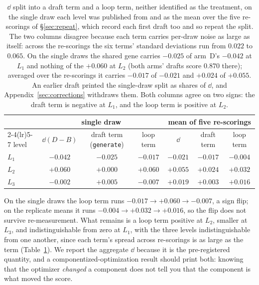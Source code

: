 \documentclass[11pt]{article}
\begin{document}
\begin{table}[h]
\centering
\small
\begin{tabular}{lcccccc}
\toprule
 & \multicolumn{3}{c}{single draw} & \multicolumn{3}{c}{mean of five re-scorings} \\
\cmidrule(lr){2-4}\cmidrule(lr){5-7}
level & $\dd(D-B)$ & draft term (\texttt{generate}) & loop term & $\dd$ & draft term & loop term \\
\midrule
$L_1$ & $-0.042$ & $\mathbf{-0.025}$ & $-0.017$ & $-0.021$ & $\mathbf{-0.017}$ & $-0.004$ \\
$L_2$ & $+0.060$ & $+0.000$ & $\mathbf{+0.060}$ & $+0.055$ & $+0.024$ & $\mathbf{+0.032}$ \\
$L_3$ & $-0.002$ & $+0.005$ & $-0.007$ & $+0.019$ & $+0.003$ & $+0.016$ \\
\bottomrule
\end{tabular}
\caption{$\dd$ split into a draft term and a loop term, neither identified as the treatment, on the
single draw each level was published from and as the mean over the five re-scorings of
\S\ref{sec:repeat}, which record each first draft too and so repeat the split. The two columns
disagree because each term carries per-draw noise as large as itself: across the re-scorings the
six terms' standard deviations run from $0.022$ to $0.065$. On the single draws the shared gene
carries $-0.025$ of arm~D's $-0.042$ at $L_1$ and nothing of the $+0.060$ at $L_2$
(both arms' drafts score $0.870$ there); averaged over the re-scorings it carries $-0.017$ of $-0.021$ and
$+0.024$ of $+0.055$. An earlier draft printed the single-draw split as shares of $\dd$, and
Appendix~\ref{sec:corrections} withdraws them. Both columns agree on two signs: the draft
term is negative at $L_1$, and the loop term is positive at $L_2$.}
\label{tab:decomp}
\end{table}

On the single draws the loop term runs $-0.017 \to +0.060 \to -0.007$, a sign flip; on the
replicate means it runs $-0.004 \to +0.032 \to +0.016$, so the flip does not survive
re-measurement. What remains is a loop term positive at $L_2$, smaller at $L_3$, and indistinguishable
from zero at $L_1$, with the three levels indistinguishable from one another, since each term's
spread across re-scorings is as large as the term (Table~\ref{tab:decomp}). We report the
aggregate $\dd$ because it is the pre-registered quantity, and a componentized-optimization result
should print both: knowing that the optimizer \emph{changed} a component does not tell you that
the component is what moved the score.
\end{document}
